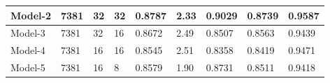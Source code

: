 \begin{table}[!htb]
\begin{center}
\begin{tabular}{|l|l|l|l|l|l|l|l|l|}
\textbf{Model-2}                & \textbf{7381}                                                   & \textbf{32}                                                        & \textbf{32}                                                        & \textbf{0.8787}   & \textbf{2.33}                                                     & \textbf{0.9029}      & \textbf{0.8739}                                              & \textbf{0.9587}                                               \\ \hline
Model-3                         & 7381                                                            & 32                                                                 & 16                                                                 & 0.8672            & 2.49                                                              & 0.8507               & 0.8563                                                       & 0.9439                                                        \\ \hline
Model-4                         & 7381                                                            & 16                                                                 & 16                                                                 & 0.8545            & 2.51                                                              & 0.8358               & 0.8419                                                       & 0.9471                                                        \\ \hline
Model-5                         & 7381                                                            & 16                                                                 & 8                                                                  & 0.8579            & 1.90                                                              & 0.8731               & 0.8511                                                       & 0.9418                                                        \\ \hline
\end{tabular}
\end{center}
\end{table}

